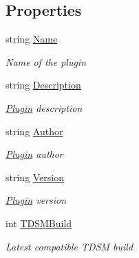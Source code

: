 \subsection*{Properties}
\begin{DoxyCompactItemize}
\item 
string \hyperlink{class_o_t_a_1_1_plugin_1_1_base_plugin_a1cc8b14161cbe1f3cbd260dfcfe3e6da}{Name}
\begin{DoxyCompactList}\small\item\em Name of the plugin \end{DoxyCompactList}\item 
string \hyperlink{class_o_t_a_1_1_plugin_1_1_base_plugin_aaf578319bed5a9ceb64b2878f132ed66}{Description}
\begin{DoxyCompactList}\small\item\em \hyperlink{namespace_o_t_a_1_1_plugin}{Plugin} description \end{DoxyCompactList}\item 
string \hyperlink{class_o_t_a_1_1_plugin_1_1_base_plugin_a226fdb70bc1df6f65d786809dec4a71d}{Author}
\begin{DoxyCompactList}\small\item\em \hyperlink{namespace_o_t_a_1_1_plugin}{Plugin} author \end{DoxyCompactList}\item 
string \hyperlink{class_o_t_a_1_1_plugin_1_1_base_plugin_a3830fbc5a8062379ac4bde202cd6602a}{Version}
\begin{DoxyCompactList}\small\item\em \hyperlink{namespace_o_t_a_1_1_plugin}{Plugin} version \end{DoxyCompactList}\item 
int \hyperlink{class_o_t_a_1_1_plugin_1_1_base_plugin_ad4d8466484faae77cf2f1999e0626686}{T\+D\+S\+M\+Build}
\begin{DoxyCompactList}\small\item\em Latest compatible T\+D\+S\+M build \end{DoxyCompactList}\item 

\end{DoxyCompactItemize}
